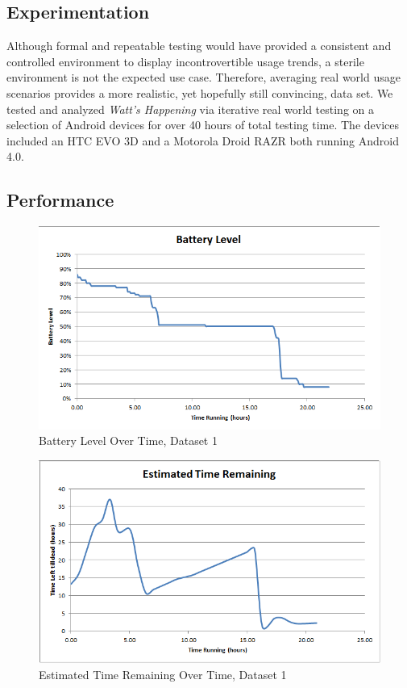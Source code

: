 \subsection{Experimentation}
Although formal and repeatable testing would have provided a consistent and controlled environment to display incontrovertible usage trends, a sterile environment is not the expected use case.
Therefore, averaging real world usage scenarios provides a more realistic, yet hopefully still convincing, data set.
We tested and analyzed \emph{Watt's Happening} via iterative real world testing on a selection of Android devices for over 40 hours of total testing time.
The devices included an HTC EVO 3D and a Motorola Droid RAZR both running Android 4.0. 

\subsection{Performance}
\begin{figure}[h]
	\begin{center}
		\includegraphics[scale=0.5]{figs/battery_level.png}
		\caption{Battery Level Over Time, Dataset 1}
		\label{fig:bat_level}
\end{center}
\end{figure}
\begin{figure}[h]
	\begin{center}
		\includegraphics[scale=0.5]{figs/est_time_remaining.png}
		\caption{Estimated Time Remaining Over Time, Dataset 1}
		\label{fig:est_remaining}
\end{center}
\end{figure}
